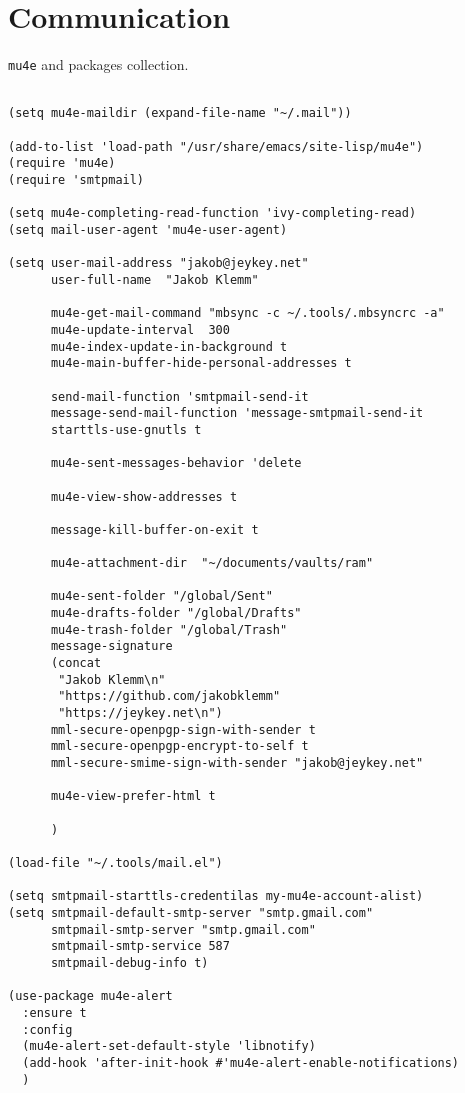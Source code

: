 \documentclass[11pt]{article}
\begin{document}
\section{Communication}
\label{sec:orgf9ae7e1}
\texttt{mu4e} and packages collection.
\begin{verbatim}

(setq mu4e-maildir (expand-file-name "~/.mail"))

(add-to-list 'load-path "/usr/share/emacs/site-lisp/mu4e")
(require 'mu4e)
(require 'smtpmail)

(setq mu4e-completing-read-function 'ivy-completing-read)
(setq mail-user-agent 'mu4e-user-agent)

(setq user-mail-address "jakob@jeykey.net"
      user-full-name  "Jakob Klemm"

      mu4e-get-mail-command "mbsync -c ~/.tools/.mbsyncrc -a"
      mu4e-update-interval  300
      mu4e-index-update-in-background t
      mu4e-main-buffer-hide-personal-addresses t

      send-mail-function 'smtpmail-send-it
      message-send-mail-function 'message-smtpmail-send-it
      starttls-use-gnutls t

      mu4e-sent-messages-behavior 'delete

      mu4e-view-show-addresses t

      message-kill-buffer-on-exit t

      mu4e-attachment-dir  "~/documents/vaults/ram"

      mu4e-sent-folder "/global/Sent"
      mu4e-drafts-folder "/global/Drafts"
      mu4e-trash-folder "/global/Trash"
      message-signature
      (concat
       "Jakob Klemm\n"
       "https://github.com/jakobklemm"
       "https://jeykey.net\n")
      mml-secure-openpgp-sign-with-sender t
      mml-secure-openpgp-encrypt-to-self t
      mml-secure-smime-sign-with-sender "jakob@jeykey.net"

      mu4e-view-prefer-html t

      )

(load-file "~/.tools/mail.el")

(setq smtpmail-starttls-credentilas my-mu4e-account-alist)
(setq smtpmail-default-smtp-server "smtp.gmail.com"
      smtpmail-smtp-server "smtp.gmail.com"
      smtpmail-smtp-service 587
      smtpmail-debug-info t)

(use-package mu4e-alert
  :ensure t
  :config
  (mu4e-alert-set-default-style 'libnotify)
  (add-hook 'after-init-hook #'mu4e-alert-enable-notifications)
  )


\end{verbatim}
\end{document}
